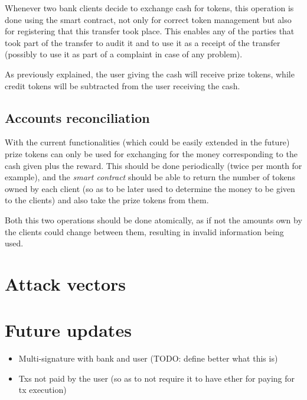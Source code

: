 \documentclass[a4paper]{article}
\begin{document}
Whenever two bank clients decide to exchange cash for tokens, this operation is done using the smart contract, not only for correct token management but also for registering that this transfer took place. This enables any of the parties that took part of the transfer to audit it and to use it as a receipt of the transfer (possibly to use it as part of a complaint in case of any problem).

As previously explained, the user giving the cash will receive prize tokens, while credit tokens will be subtracted from the user receiving the cash.

\subsection{Accounts reconciliation}

With the current functionalities (which could be easily extended in the future) prize tokens can only be used for exchanging for the money corresponding to the cash given plus the reward. This should be done periodically (twice per month for example), and the \textit{smart contract} should be able to return the number of tokens owned by each client (so as to be later used to determine the money to be given to the clients) and also take the prize tokens from them.

Both this two operations should be done atomically, as if not the amounts own by the clients could change between them, resulting in invalid information being used.

\section{Attack vectors} %

\section{Future updates}

\begin{itemize}
\item Multi-signature with bank and user (TODO: define better what this is)
\item Txs not paid by the user (so as to not require it to have ether for paying for tx execution)
\end{itemize}
\end{document}
